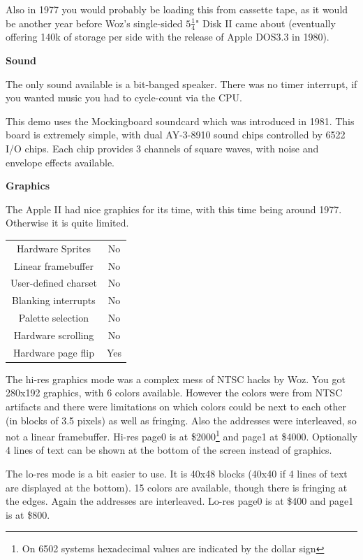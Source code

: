 \documentclass[twocolumn]{article}
\begin{document}
	Also in 1977 you would probably be loading this from cassette tape, as
	it would be another year before Woz's single-sided
	$5\frac{1}{4}$" Disk II came about (eventually offering 140k of
	storage per side with the release of Apple DOS3.3 in 1980). 
	
	{\bf Sound}

	The only sound available is a bit-banged speaker.
	There was no timer interrupt,
	if you wanted music you had to cycle-count via the CPU.

	This demo uses the Mockingboard soundcard which was introduced in
	1981.  This board is extremely simple, with dual AY-3-8910 sound
	chips controlled by 6522 I/O chips.
	Each chip provides 3 channels of square waves, with noise and
	envelope effects available.

	{\bf Graphics}

	The Apple II had nice graphics for its time, with this time being
	around 1977.  Otherwise it is quite limited.

	\begin{center}
	\begin{tabular}{|c|c|}
	\hline
	Hardware Sprites     &	No \\
	Linear framebuffer   &	No \\
	User-defined charset &	No \\
	Blanking interrupts  &	No \\
	Palette selection    &	No \\
	Hardware scrolling   &	No \\
	Hardware page flip   &	Yes \\
	\hline
	\end{tabular}
	\end{center}

	The hi-res graphics mode was a complex mess of NTSC hacks by Woz.
	You got 280x192 graphics, with 6 colors available.  However the colors
	were from NTSC artifacts and there were limitations on which colors
	could be next to each other (in blocks of 3.5 pixels) as well as
	fringing.  Also the addresses were interleaved, so not a linear
	framebuffer.  Hi-res page0 is at
	\$2000\footnote{On 6502 systems hexadecimal values are 
	indicated by the dollar sign}
	 and page1 at \$4000.
	Optionally 4 lines of text can be shown at the bottom of the
	screen instead of graphics.

	The lo-res mode is a bit easier to use.  It is 40x48 blocks
	(40x40 if 4 lines of text are displayed at the bottom).
	15 colors are available, though there is fringing at the edges.
	Again the addresses are interleaved.  Lo-res page0 is at \$400
	and page1 is at \$800.
\end{document}
